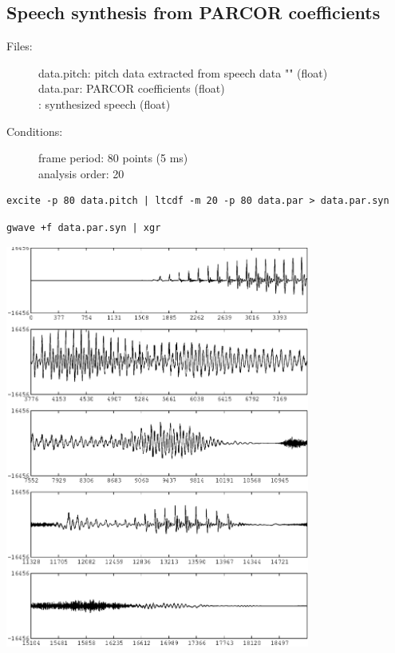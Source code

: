 \documentclass[a4paper,10pt]{article}
\begin{document}
\subsection{Speech synthesis from PARCOR coefficients}
\begin{description}
\item[Files:]
  data.pitch: pitch data extracted from speech data "" (float)\\
  data.par: PARCOR coefficients (float)\\
  :
  synthesized speech (float)
\item[Conditions:]
  frame period: 80 points (5 ms)\\
  analysis order: 20
\end{description}

\begin{verbatim}
excite -p 80 data.pitch | ltcdf -m 20 -p 80 data.par > data.par.syn
\end{verbatim}

\begin{verbatim}
gwave +f data.par.syn | xgr
\end{verbatim}

\includegraphics[width=10cm]{eps/data.par.syn.gwave.eps}
\end{document}
